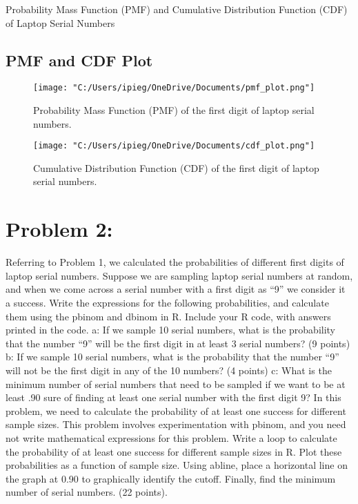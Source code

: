 \documentclass{article}
\begin{document}
\begin{table}[H]
\centering
{} %
\caption{Probability Mass Function (PMF) and Cumulative Distribution Function (CDF) of Laptop Serial Numbers}
\end{table}

\subsection{PMF and CDF Plot}

\begin{figure}[H]
    \centering
    \texttt{[image: "C:/Users/ipieg/OneDrive/Documents/pmf\_plot.png"]}
    \caption{Probability Mass Function (PMF) of the first digit of laptop serial numbers.}
    \label{fig:pmf}
\end{figure}

\begin{figure}[H]
    \centering
    \texttt{[image: "C:/Users/ipieg/OneDrive/Documents/cdf\_plot.png"]}
    \caption{Cumulative Distribution Function (CDF) of the first digit of laptop serial numbers.}
    \label{fig:cdf}
\end{figure}

\section{Problem 2:}
Referring to Problem 1, we calculated the probabilities of different first digits of laptop
serial numbers. Suppose we are sampling laptop serial numbers at random, and when we
come across a serial number with a first digit as “9” we consider it a success. Write the
expressions for the following probabilities, and calculate them using the pbinom and
dbinom in R. Include your R code, with answers printed in the code.
a: If we sample 10 serial numbers, what is the probability that the number “9” will be the
first digit in at least 3 serial numbers? (9 points)
b: If we sample 10 serial numbers, what is the probability that the number “9” will not be
the first digit in any of the 10 numbers? (4 points)
c: What is the minimum number of serial numbers that need to be sampled if we want to
be at least .90 sure of finding at least one serial number with the first digit 9? In this
problem, we need to calculate the probability of at least one success for different sample
sizes. This problem involves experimentation with pbinom, and you need not write
mathematical expressions for this problem. Write a loop to calculate the probability of
at least one success for different sample sizes in R. Plot these probabilities as a function
of sample size. Using abline, place a horizontal line on the graph at 0.90 to graphically
identify the cutoff. Finally, find the minimum number of serial numbers. (22 points).
\end{document}
